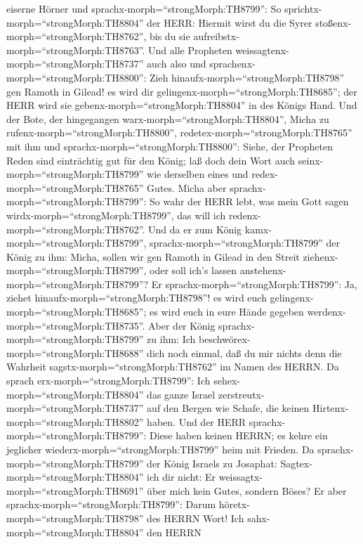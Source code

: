 eiserne Hörner und sprachx-morph=``strongMorph:TH8799'': So
sprichtx-morph=``strongMorph:TH8804'' der HERR: Hiermit wirst du die
Syrer stoßenx-morph=``strongMorph:TH8762'', bis du sie
aufreibstx-morph=``strongMorph:TH8763''.  Und alle
Propheten weissagtenx-morph=``strongMorph:TH8737'' auch also und
sprachenx-morph=``strongMorph:TH8800'': Zieh
hinaufx-morph=``strongMorph:TH8798'' gen Ramoth in Gilead! es wird dir
gelingenx-morph=``strongMorph:TH8685''; der HERR wird sie
gebenx-morph=``strongMorph:TH8804'' in des Königs Hand. 
Und der Bote, der hingegangen warx-morph=``strongMorph:TH8804'', Micha
zu rufenx-morph=``strongMorph:TH8800'',
redetex-morph=``strongMorph:TH8765'' mit ihm und
sprachx-morph=``strongMorph:TH8800'': Siehe, der Propheten Reden sind
einträchtig gut für den König; laß doch dein Wort auch
seinx-morph=``strongMorph:TH8799'' wie derselben eines und
redex-morph=``strongMorph:TH8765'' Gutes.  Micha aber
sprachx-morph=``strongMorph:TH8799'': So wahr der HERR lebt, was mein
Gott sagen wirdx-morph=``strongMorph:TH8799'', das will ich
redenx-morph=``strongMorph:TH8762''.  Und da er zum König
kamx-morph=``strongMorph:TH8799'', sprachx-morph=``strongMorph:TH8799''
der König zu ihm: Micha, sollen wir gen Ramoth in Gilead in den Streit
ziehenx-morph=``strongMorph:TH8799'', oder soll ich's lassen
anstehenx-morph=``strongMorph:TH8799''? Er
sprachx-morph=``strongMorph:TH8799'': Ja, ziehet
hinaufx-morph=``strongMorph:TH8798''! es wird euch
gelingenx-morph=``strongMorph:TH8685''; es wird euch in eure Hände
gegeben werdenx-morph=``strongMorph:TH8735''.  Aber der
König sprachx-morph=``strongMorph:TH8799'' zu ihm: Ich
beschwörex-morph=``strongMorph:TH8688'' dich noch einmal, daß du mir
nichts denn die Wahrheit sagstx-morph=``strongMorph:TH8762'' im Namen
des HERRN.  Da sprach erx-morph=``strongMorph:TH8799'': Ich
sehex-morph=``strongMorph:TH8804'' das ganze Israel
zerstreutx-morph=``strongMorph:TH8737'' auf den Bergen wie Schafe, die
keinen Hirtenx-morph=``strongMorph:TH8802'' haben. Und der HERR
sprachx-morph=``strongMorph:TH8799'': Diese haben keinen HERRN; es kehre
ein jeglicher wiederx-morph=``strongMorph:TH8799'' heim mit Frieden.
 Da sprachx-morph=``strongMorph:TH8799'' der König Israels
zu Josaphat: Sagtex-morph=``strongMorph:TH8804'' ich dir nicht: Er
weissagtx-morph=``strongMorph:TH8691'' über mich kein Gutes, sondern
Böses?  Er aber sprachx-morph=``strongMorph:TH8799'': Darum
höretx-morph=``strongMorph:TH8798'' des HERRN Wort! Ich
sahx-morph=``strongMorph:TH8804'' den HERRN
